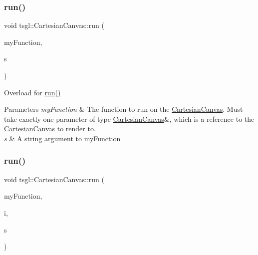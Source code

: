 \subsubsection{\texorpdfstring{run()}{run()}\hspace{0.1cm}{\footnotesize\ttfamily [6/8]}}
{\footnotesize\ttfamily void tsgl\+::\+Cartesian\+Canvas\+::run (\begin{DoxyParamCaption}\item[{void($\ast$)(\hyperlink{classtsgl_1_1_cartesian_canvas}{Cartesian\+Canvas} \&, std\+::string)}]{my\+Function,  }\item[{std\+::string}]{s }\end{DoxyParamCaption})}



Overload for \hyperlink{classtsgl_1_1_cartesian_canvas_a63a948af53582b713957b872a765dcdb}{run()} 


\begin{DoxyParams}{Parameters}
{\em my\+Function} & The function to run on the \hyperlink{classtsgl_1_1_cartesian_canvas}{Cartesian\+Canvas}. Must take exactly one parameter of type \hyperlink{classtsgl_1_1_cartesian_canvas}{Cartesian\+Canvas}\&, which is a reference to the \hyperlink{classtsgl_1_1_cartesian_canvas}{Cartesian\+Canvas} to render to. \\
\hline
{\em s} & A string argument to my\+Function \\
\hline
\end{DoxyParams}
\mbox{\label{classtsgl_1_1_cartesian_canvas_ab0bce76883df5ae48e368a7b7835aefd}} 
\subsubsection{\texorpdfstring{run()}{run()}\hspace{0.1cm}{\footnotesize\ttfamily [7/8]}}
{\footnotesize\ttfamily void tsgl\+::\+Cartesian\+Canvas\+::run (\begin{DoxyParamCaption}\item[{void($\ast$)(\hyperlink{classtsgl_1_1_cartesian_canvas}{Cartesian\+Canvas} \&, int, std\+::string)}]{my\+Function,  }\item[{int}]{i,  }\item[{std\+::string}]{s }\end{DoxyParamCaption})}



